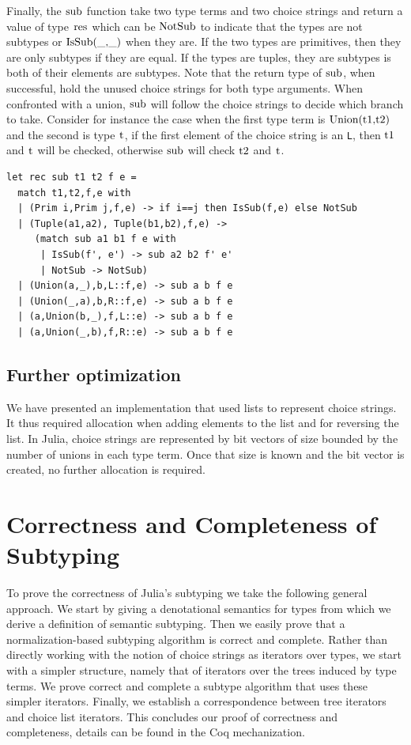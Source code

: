 \documentclass[a4paper,english]{lipics-v2019}
\renewcommand{\L}{{\tt L}\xspace}
\renewcommand{\c}[1]{\ensuremath{\text{\lstinline{#1}}}\xspace}
\begin{document}
\noindent
Finally, the \c{sub} function take two type terms and two choice strings and
return a value of type \c{res} which can be \c{NotSub} to indicate that the
types are not subtypes or \c{IsSub(_,_)} when they are.  If the two types
are primitives, then they are only subtypes if they are equal.  If the types
are tuples, they are subtypes is both of their elements are subtypes. Note
that the return type of \c{sub}, when successful, hold the unused choice
strings for both type arguments. When confronted with a union, \c{sub} will
follow the choice strings to decide which branch to take. Consider for
instance the case when the first type term is \c{Union(t1,t2)} and the
second is type \c{t}, if the first element of the choice string is an \L,
then \c{t1} and \c{t} will be checked, otherwise \c{sub} will check \c{t2}
and \c{t}.

\begin{lstlisting}
let rec sub t1 t2 f e =
  match t1,t2,f,e with 
  | (Prim i,Prim j,f,e) -> if i==j then IsSub(f,e) else NotSub
  | (Tuple(a1,a2), Tuple(b1,b2),f,e) ->
     (match sub a1 b1 f e with
      | IsSub(f', e') -> sub a2 b2 f' e'
      | NotSub -> NotSub)
  | (Union(a,_),b,L::f,e) -> sub a b f e
  | (Union(_,a),b,R::f,e) -> sub a b f e
  | (a,Union(b,_),f,L::e) -> sub a b f e
  | (a,Union(_,b),f,R::e) -> sub a b f e
\end{lstlisting}

\subsection{Further optimization}

We have presented an implementation that used lists to represent choice
strings. It thus required allocation when adding elements to the list and
for reversing the list. In Julia, choice strings are represented by bit
vectors of size bounded by the number of unions in each type term.  Once
that size is known and the bit vector is created, no further allocation is
required.
\newpage

\section{Correctness and Completeness of Subtyping}

To prove the correctness of Julia's subtyping we take the following general
approach. We start by giving a denotational semantics for types from which
we derive a definition of semantic subtyping. Then we easily prove that a
normalization-based subtyping algorithm is correct and complete. Rather than
directly working with the notion of choice strings as iterators over types,
we start with a simpler structure, namely that of iterators over the trees
induced by type terms. We prove correct and complete a subtype algorithm
that uses these simpler iterators. Finally, we establish a correspondence 
between tree iterators and choice list iterators. This concludes our proof
of correctness and completeness, details can be found in the Coq
mechanization.
\end{document}
